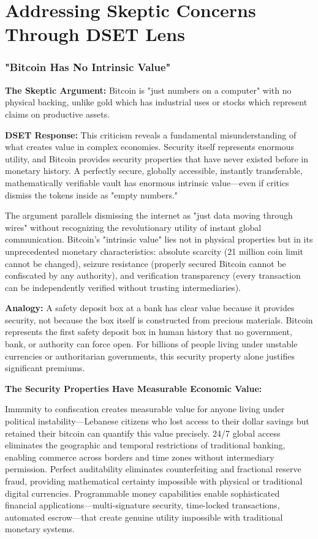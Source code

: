 \documentclass[11pt,oneside]{book}
\begin{document}
\section{Addressing Skeptic Concerns Through DSET Lens}

\subsubsection{"Bitcoin Has No Intrinsic Value"}

\textbf{The Skeptic Argument:} Bitcoin is "just numbers on a computer" with no physical backing, unlike gold which has industrial uses or stocks which represent claims on productive assets.

\textbf{DSET Response:} This criticism reveals a fundamental misunderstanding of what creates value in complex economies. Security itself represents enormous utility, and Bitcoin provides security properties that have never existed before in monetary history. A perfectly secure, globally accessible, instantly transferable, mathematically verifiable vault has enormous intrinsic value—even if critics dismiss the tokens inside as "empty numbers."

The argument parallels dismissing the internet as "just data moving through wires" without recognizing the revolutionary utility of instant global communication. Bitcoin's "intrinsic value" lies not in physical properties but in its unprecedented monetary characteristics: absolute scarcity (21 million coin limit cannot be changed), seizure resistance (properly secured Bitcoin cannot be confiscated by any authority), and verification transparency (every transaction can be independently verified without trusting intermediaries).

\textbf{Analogy:} A safety deposit box at a bank has clear value because it provides security, not because the box itself is constructed from precious materials. Bitcoin represents the first safety deposit box in human history that no government, bank, or authority can force open. For billions of people living under unstable currencies or authoritarian governments, this security property alone justifies significant premiums.

\textbf{The Security Properties Have Measurable Economic Value:}

Immunity to confiscation creates measurable value for anyone living under political instability—Lebanese citizens who lost access to their dollar savings but retained their bitcoin can quantify this value precisely. 24/7 global access eliminates the geographic and temporal restrictions of traditional banking, enabling commerce across borders and time zones without intermediary permission. Perfect auditability eliminates counterfeiting and fractional reserve fraud, providing mathematical certainty impossible with physical or traditional digital currencies. Programmable money capabilities enable sophisticated financial applications—multi-signature security, time-locked transactions, automated escrow—that create genuine utility impossible with traditional monetary systems.
\end{document}
